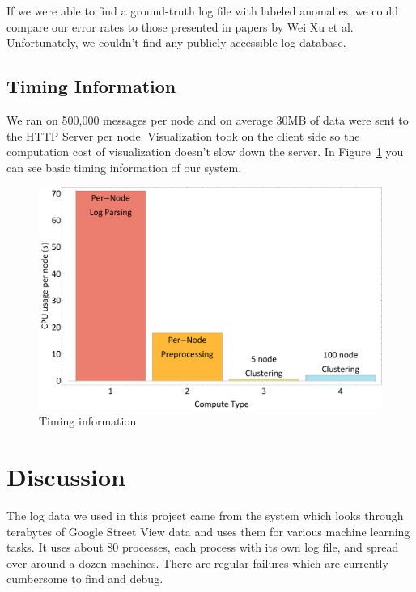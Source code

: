 \documentclass[conference]{style/acmsiggraph}
\begin{document}
If we were able to find a ground-truth log file with labeled anomalies, we could compare our error
rates to those presented in papers by Wei Xu et al. Unfortunately, we couldn't find any publicly
accessible log database.

\subsection{Timing Information}
We ran on 500,000 messages per node and on average 30MB of data were sent to the HTTP Server per
node. Visualization took on the client side so the computation cost of visualization doesn't slow
down the server. In Figure~\ref{fig:timings} you can see basic timing information of our system.

\begin{figure}[p]
    \centering
    \includegraphics[width=1.0\columnwidth]{images/timing.pdf}
    \caption{Timing information}
    \label{fig:timings}
\end{figure}


\section{Discussion}

The log data we used in this project came from the system which looks through terabytes of Google
Street View data and uses them for various machine learning tasks. It uses about 80 processes, each
process with its own log file, and spread over around a dozen machines. There are regular failures
which are currently cumbersome to find and debug.
\end{document}
